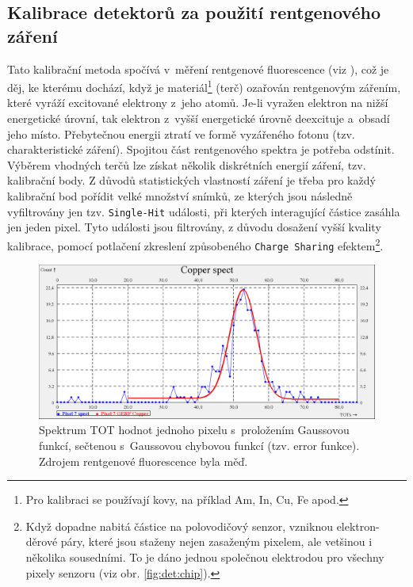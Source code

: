 \subsection{Kalibrace detektorů za použití rentgenového záření}\label{calib:xray}
Tato kalibrační metoda \cite{Jakubek2011S262} spočívá v~měření rentgenové fluorescence (viz \cite{Jakubek-radiography_and_charge_sharing}),
což je děj, ke kterému dochází, když je materiál\footnote{Pro kalibraci se používají kovy, na příklad Am, In, Cu, Fe apod.} (terč)
ozařován rentgenovým zářením, které vyráží excitované elektrony z~jeho atomů. Je-li vyražen elektron na nižší energetické úrovní, tak elektron z~vyšší energetické úrovně deexcituje a~obsadí jeho místo. 
Přebytečnou energii ztratí ve formě vyzářeného fotonu (tzv. charakteristické záření). Spojitou část rentgenového spektra je potřeba odstínit. Výběrem vhodných terčů lze získat několik diskrétních energií záření, tzv. kalibrační body. Z důvodů statistických vlastností záření je třeba pro každý kalibrační bod pořídit velké množství snímků, ze kterých jsou následně vyfiltrovány jen tzv. \texttt{Single-Hit} události,
při kterých interagující částice zasáhla jen jeden pixel. 
Tyto události jsou filtrovány, z důvodu dosažení vyšší kvality kalibrace, pomocí potlačení zkreslení způsobeného \texttt{Charge Sharing} efektem\footnote{Když dopadne nabitá částice na polovodičový senzor, vzniknou elektron-děrové páry, které jsou staženy nejen zasaženým pixelem, ale vetšinou i několika sousedními. To je dáno jednou společnou elektrodou pro všechny pixely senzoru (viz obr. \ref{fig:det:chip}).}.

\begin{figure}[th]
	\begin{center}
		\includegraphics[width=14cm]{figures/calib_gerf.png}
		\caption{Spektrum TOT hodnot jednoho pixelu s~proložením Gaussovou funkcí, sečtenou s~Gaussovou chybovou funkcí (tzv. error funkce). Zdrojem rentgenové fluorescence byla měď.}
		\label{fig:calib:gerf}
	\end{center}
\end{figure}

